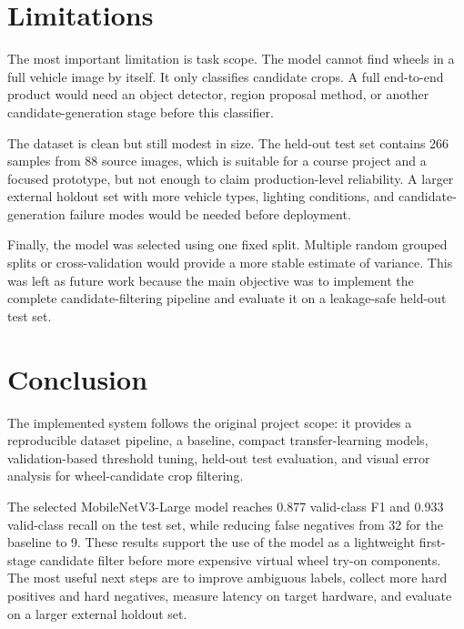 \documentclass[letterpaper, 10 pt]{IEEEconf}
\begin{document}
\section{Limitations}

The most important limitation is task scope. The model cannot find wheels in a
full vehicle image by itself. It only classifies candidate crops. A full
end-to-end product would need an object detector, region proposal method, or
another candidate-generation stage before this classifier.

The dataset is clean but still modest in size. The held-out test set contains
266 samples from 88 source images, which is suitable for a course project and a
focused prototype, but not enough to claim production-level reliability. A
larger external holdout set with more vehicle types, lighting conditions, and
candidate-generation failure modes would be needed before deployment.

Finally, the model was selected using one fixed split. Multiple random grouped
splits or cross-validation would provide a more stable estimate of variance.
This was left as future work because the main objective was to implement the
complete candidate-filtering pipeline and evaluate it on a leakage-safe held-out
test set.

\section{Conclusion}

The implemented system follows the original project scope: it provides a
reproducible dataset pipeline, a baseline, compact transfer-learning models,
validation-based threshold tuning, held-out test evaluation, and visual error
analysis for wheel-candidate crop filtering.

The selected MobileNetV3-Large model reaches 0.877 valid-class F1 and 0.933
valid-class recall on the test set, while reducing false negatives from 32 for
the baseline to 9. These results support the use of the model as a lightweight
first-stage candidate filter before more expensive virtual wheel try-on
components. The most useful next steps are to improve ambiguous labels, collect
more hard positives and hard negatives, measure latency on target hardware, and
evaluate on a larger external holdout set.
\end{document}
